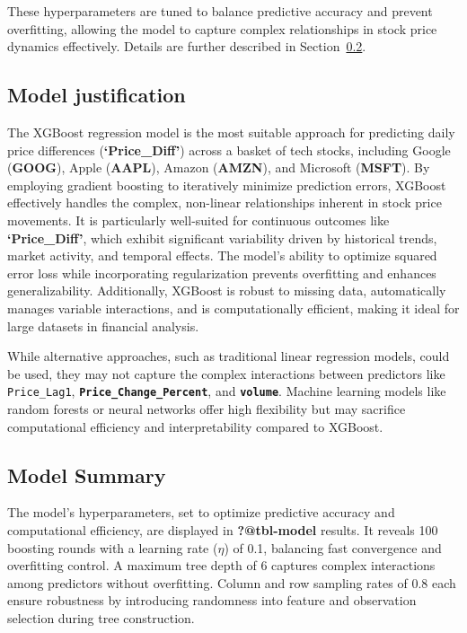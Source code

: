 \documentclass[
  letterpaper,
  DIV=11,
  numbers=noendperiod]{scrartcl}
\begin{document}
These hyperparameters are tuned to balance predictive accuracy and
prevent overfitting, allowing the model to capture complex relationships
in stock price dynamics effectively. Details are further described in
Section~\ref{sec-model-summary}.

\subsection{Model justification}\label{model-justification}

The XGBoost regression model is the most suitable approach for
predicting daily price differences (\textbf{`Price\_Diff'}) across a
basket of tech stocks, including Google (\textbf{GOOG}), Apple
(\textbf{AAPL}), Amazon (\textbf{AMZN}), and Microsoft (\textbf{MSFT}).
By employing gradient boosting to iteratively minimize prediction
errors, XGBoost effectively handles the complex, non-linear
relationships inherent in stock price movements. It is particularly
well-suited for continuous outcomes like \textbf{`Price\_Diff'}, which
exhibit significant variability driven by historical trends, market
activity, and temporal effects. The model's ability to optimize squared
error loss while incorporating regularization prevents overfitting and
enhances generalizability. Additionally, XGBoost is robust to missing
data, automatically manages variable interactions, and is
computationally efficient, making it ideal for large datasets in
financial analysis.

While alternative approaches, such as traditional linear regression
models, could be used, they may not capture the complex interactions
between predictors like \texttt{Price\_Lag1},
\textbf{\texttt{Price\_Change\_Percent}}, and \textbf{\texttt{volume}}.
Machine learning models like random forests or neural networks offer
high flexibility but may sacrifice computational efficiency and
interpretability compared to XGBoost.

\subsection{Model Summary}\label{sec-model-summary}

The model's hyperparameters, set to optimize predictive accuracy and
computational efficiency, are displayed in \textbf{?@tbl-model} results.
It reveals 100 boosting rounds with a learning rate (\(\eta\)) of 0.1,
balancing fast convergence and overfitting control. A maximum tree depth
of 6 captures complex interactions among predictors without overfitting.
Column and row sampling rates of 0.8 each ensure robustness by
introducing randomness into feature and observation selection during
tree construction.
\end{document}
